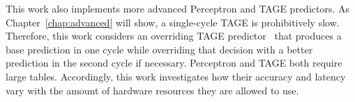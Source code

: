 This work also implements more advanced Perceptron and TAGE predictors. As Chapter~\ref{chap:advanced} will show, a single-cycle TAGE is prohibitively slow. Therefore, this work considers an overriding TAGE predictor~\cite{override} that produces a base prediction in one cycle while overriding that decision with a better prediction in the second cycle if necessary. Perceptron and TAGE both require large tables. Accordingly, this work investigates how their accuracy and latency vary with the amount of hardware resources they are allowed to use.


